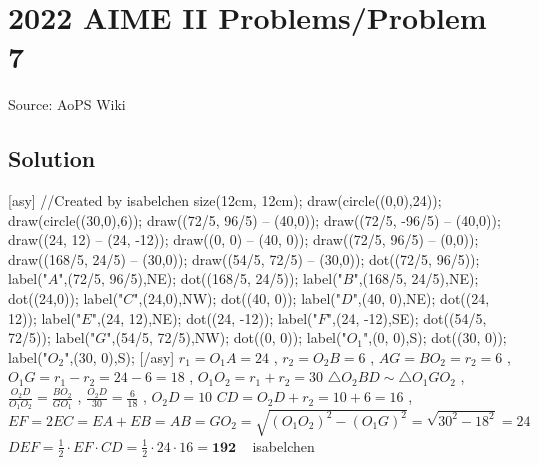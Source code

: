 \documentclass[12pt]{article}
\begin{document}
\section*{{2022 AIME II Problems/Problem 7}}
Source: AoPS Wiki

\subsection*{Solution}
[asy] //Created by isabelchen size(12cm, 12cm); draw(circle((0,0),24)); draw(circle((30,0),6)); draw((72/5, 96/5) -- (40,0)); draw((72/5, -96/5) -- (40,0)); draw((24, 12) -- (24, -12)); draw((0, 0) -- (40, 0)); draw((72/5, 96/5) -- (0,0)); draw((168/5, 24/5) -- (30,0)); draw((54/5, 72/5) -- (30,0)); dot((72/5, 96/5)); label("$A$",(72/5, 96/5),NE); dot((168/5, 24/5)); label("$B$",(168/5, 24/5),NE); dot((24,0)); label("$C$",(24,0),NW); dot((40, 0)); label("$D$",(40, 0),NE); dot((24, 12)); label("$E$",(24, 12),NE); dot((24, -12)); label("$F$",(24, -12),SE); dot((54/5, 72/5)); label("$G$",(54/5, 72/5),NW); dot((0, 0)); label("$O_1$",(0, 0),S); dot((30, 0)); label("$O_2$",(30, 0),S); [/asy] $r_1 = O_1A = 24$ , $r_2 = O_2B = 6$ , $AG = BO_2 = r_2 = 6$ , $O_1G = r_1 - r_2 = 24 - 6 = 18$ , $O_1O_2 = r_1 + r_2 = 30$ $\triangle O_2BD \sim \triangle O_1GO_2$ , $\frac{O_2D}{O_1O_2} = \frac{BO_2}{GO_1}$ , $\frac{O_2D}{30} = \frac{6}{18}$ , $O_2D = 10$ $CD = O_2D + r_2 = 10 + 6 = 16$ , $EF = 2EC = EA + EB = AB = GO_2 = \sqrt{(O_1O_2)^2-(O_1G)^2} = \sqrt{30^2-18^2} = 24$ $DEF = \frac12 \cdot EF \cdot CD = \frac12 \cdot 24 \cdot 16 = \boxed{\textbf{192}}$ ~ isabelchen
\end{document}
